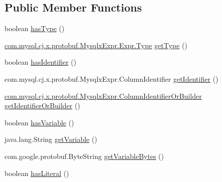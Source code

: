 \subsection*{Public Member Functions}
\begin{DoxyCompactItemize}
\item 
boolean \mbox{\hyperlink{interfacecom_1_1mysql_1_1cj_1_1x_1_1protobuf_1_1_mysqlx_expr_1_1_expr_or_builder_a704435dcecb8f35a1673277d2b9b0584}{has\+Type}} ()
\item 
\mbox{\hyperlink{enumcom_1_1mysql_1_1cj_1_1x_1_1protobuf_1_1_mysqlx_expr_1_1_expr_1_1_type}{com.\+mysql.\+cj.\+x.\+protobuf.\+Mysqlx\+Expr.\+Expr.\+Type}} \mbox{\hyperlink{interfacecom_1_1mysql_1_1cj_1_1x_1_1protobuf_1_1_mysqlx_expr_1_1_expr_or_builder_ac3da0ada4fc1de01ded5f37a66e29c31}{get\+Type}} ()
\item 
boolean \mbox{\hyperlink{interfacecom_1_1mysql_1_1cj_1_1x_1_1protobuf_1_1_mysqlx_expr_1_1_expr_or_builder_af0f03ff98b5cdc35bfc6ef81c8e00528}{has\+Identifier}} ()
\item 
com.\+mysql.\+cj.\+x.\+protobuf.\+Mysqlx\+Expr.\+Column\+Identifier \mbox{\hyperlink{interfacecom_1_1mysql_1_1cj_1_1x_1_1protobuf_1_1_mysqlx_expr_1_1_expr_or_builder_a7837b0860e1a9e5a5848ef68ead8de97}{get\+Identifier}} ()
\item 
\mbox{\hyperlink{interfacecom_1_1mysql_1_1cj_1_1x_1_1protobuf_1_1_mysqlx_expr_1_1_column_identifier_or_builder}{com.\+mysql.\+cj.\+x.\+protobuf.\+Mysqlx\+Expr.\+Column\+Identifier\+Or\+Builder}} \mbox{\hyperlink{interfacecom_1_1mysql_1_1cj_1_1x_1_1protobuf_1_1_mysqlx_expr_1_1_expr_or_builder_aa4a3d692e32c68a5e1bdffff879b3238}{get\+Identifier\+Or\+Builder}} ()
\item 
boolean \mbox{\hyperlink{interfacecom_1_1mysql_1_1cj_1_1x_1_1protobuf_1_1_mysqlx_expr_1_1_expr_or_builder_ae660c7bec97f5ae9f3086fbd8a042648}{has\+Variable}} ()
\item 
java.\+lang.\+String \mbox{\hyperlink{interfacecom_1_1mysql_1_1cj_1_1x_1_1protobuf_1_1_mysqlx_expr_1_1_expr_or_builder_ae7abcdd2c6cd412574dff795e3971212}{get\+Variable}} ()
\item 
com.\+google.\+protobuf.\+Byte\+String \mbox{\hyperlink{interfacecom_1_1mysql_1_1cj_1_1x_1_1protobuf_1_1_mysqlx_expr_1_1_expr_or_builder_a77f4d3ce9d68a5da64316022869fe527}{get\+Variable\+Bytes}} ()
\item 
boolean \mbox{\hyperlink{interfacecom_1_1mysql_1_1cj_1_1x_1_1protobuf_1_1_mysqlx_expr_1_1_expr_or_builder_a26e4612519fde022c5db748b33247474}{has\+Literal}} ()
\item 

\end{DoxyCompactItemize}
